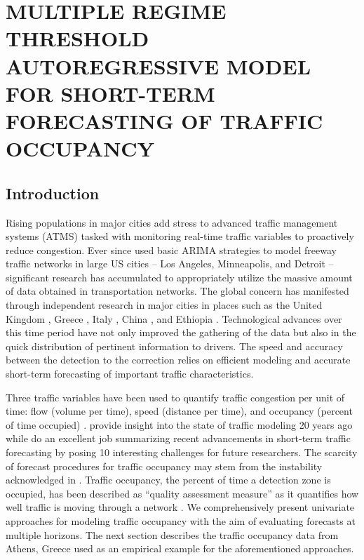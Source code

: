 \chapter{MULTIPLE REGIME THRESHOLD AUTOREGRESSIVE MODEL FOR SHORT-TERM FORECASTING OF TRAFFIC OCCUPANCY}
\label{chap:traffic}
\section{Introduction}
Rising populations in major cities add stress to advanced traffic management systems (ATMS) tasked with monitoring real-time traffic variables to proactively reduce congestion. Ever since \cite{Ahmed1979} used basic ARIMA strategies to model freeway traffic networks in large US cities -- Los Angeles, Minneapolis, and Detroit -- significant research has accumulated to appropriately utilize the massive amount of data obtained in transportation networks. The global concern has manifested through independent research in major cities in places such as the United Kingdom \citep{Queen2009,Dunne2012}, Greece \citep{Stathopoulos2003, Kamarianakis2012,Theofilatos2017}, Italy \citep{Annunziato2013,Moretti2015}, China \citep{Shang2006,Jun2007,Min2010}, and Ethiopia \citep{Hellendoorn2011}. Technological advances over this time period have not only improved the gathering of the data but also in the quick distribution of pertinent information to drivers. The speed and accuracy between the detection to the correction relies on efficient modeling and accurate short-term forecasting of important traffic characteristics. 

Three traffic variables have been used to quantify traffic congestion per unit of time: flow (volume per time), speed (distance per time), and occupancy (percent of time occupied) \cite{Hall1992}. \cite{Smith1997} provide insight into the state of traffic modeling 20 years ago while \cite{Vlahogianni2014} do an excellent job summarizing recent advancements in short-term traffic forecasting by posing 10 interesting challenges for future researchers. The scarcity of forecast procedures for traffic occupancy may stem from the instability acknowledged in \cite{Levin1980}. Traffic occupancy, the percent of time a detection zone is occupied, has been described as ``quality assessment measure'' as it quantifies how well traffic is moving through a network \citep{Klein1996}.  We comprehensively present univariate approaches for modeling traffic occupancy with the aim of evaluating forecasts at multiple horizons. The next section describes the traffic occupancy data from Athens, Greece used as an empirical example for the aforementioned approaches.

